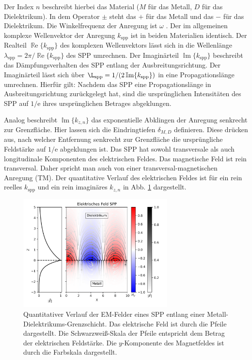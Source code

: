 \documentclass[titlepage]{article}
\renewcommand{\Re}{\operatorname{\mathbb{R}e}}
\renewcommand{\Im}{\operatorname{\mathbb{I}m}}
\begin{document}
	Der Index $n$ beschreibt hierbei das Material ($M$ für das Metall, $D$ für das Dielektrikum). In dem Operator $\pm$ steht das $+$ für das Metall und das $-$ für das Dielektrikum. Die Winkelfrequenz der Anregung ist $\omega$ . Der im allgemeinen komplexe Wellenvektor der Anregung $k_{\mathrm{spp}}$ ist in beiden Materialien identisch. Der Realteil $\Re\{k_{\mathrm{spp}}\}$ des komplexen Wellenvektors lässt sich in die Wellenlänge $\lambda_{\mathrm{spp}} = 2\pi/ \Re\{k_{\mathrm{spp}}\} $ des SPP umrechnen. Der Imaginärteil $\Im\{k_{\mathrm{spp}}\}$ beschreibt das Dämpfungsverhalten des SPP entlang der Ausbreitungsrichtung. Der Imaginärteil lässt sich über $\L_{\mathrm{spp}} = 1/(2\Im\{k_{\mathrm{spp}}\})$ in eine Propagationslänge umrechnen.  Hierfür gilt: Nachdem das SPP eine Propagationslänge in Ausbreitungsrichtung zurückgelegt hat, sind die ursprünglichen Intensitäten des SPP auf $1/\mathrm{e}$ ihres ursprünglichen Betrages abgeklungen.
	
	Analog beschreibt $\Im\{k_{z, n}\}$ das exponentielle Abklingen der Anregung senkrecht zur Grenzfläche. Hier lassen sich die Eindringtiefen $\delta_{M,D}$ definieren. Diese drücken aus, nach welcher Entfernung senkrecht zur Grenzfläche die ursprüngliche Feldstärke auf $1/\mathrm{e}$ abgeklungen ist. Das SPP hat sowohl transversale als auch longitudinale Komponenten des elektrischen Feldes. Das magnetische Feld ist rein transversal. Daher spricht man auch von einer transversal-magnetischen Anregung (TM).
	Der quantitative Verlauf des elektrischen Feldes ist für ein rein reelles $k_{\mathrm{spp}}$ und ein rein imaginäres $k_{z, n}$ in Abb. \ref{fig:electric_field_spp} dargestellt.
	\begin{figure}[htbp] 
		\centering
		\includegraphics[width=0.7\textwidth]{figures/E_Feld_SPP.png}
		\caption{Quantitativer Verlauf der EM-Felder eines SPP entlang einer Metall-Dielektrikums-Grenzschicht. Das elektrische Feld ist durch die Pfeile dargestellt. Die Schwarzweiß-Skala der Pfeile entspricht dem Betrag der elektrischen Feldstärke. Die $y$-Komponente des Magnetfeldes ist durch die Farbskala dargestellt.}
		\label{fig:electric_field_spp}
	\end{figure}
	
\end{document}
